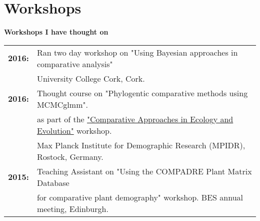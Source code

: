 \documentclass[10pt,a4paper]{article}
\begin{document}
\section{Workshops}
\raggedright\textbf{Workshops I have thought on}\\
\begin{tabular}{ll}
\textbf{2016:} & Ran two day workshop on "Using Bayesian approaches in comparative analysis"\\
&University College Cork, Cork.\\
\textbf{2016:} & Thought course on "Phylogentic comparative methods using MCMCglmm".\\
& as part of the \href{http://www.demogr.mpg.de/En/education_career/international_advanced_studies_in_demography_3279/past_courses_3280/comparative_approaches_in_ecology_and_evolution_4708/default.htm}{"Comparative Approaches in Ecology and Evolution"} workshop.\\
& Max Planck Institute for Demographic Research (MPIDR), Rostock, Germany.\\
\textbf{2015:} & Teaching Assistant on "Using the COMPADRE Plant Matrix Database\\
& for comparative plant demography" workshop. BES annual meeting, Edinburgh.\\
\end{tabular}
\end{document}
